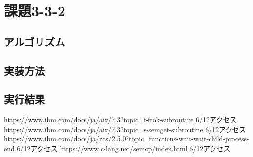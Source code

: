 \documentclass[dvipdfmx]{jarticle}
\begin{document}
\section{課題3-3-2}
\subsection{アルゴリズム}
\subsection{実装方法}
\subsection{実行結果}
\begin{thebibliography}{99}
     \url{https://www.ibm.com/docs/ja/aix/7.3?topic=f-ftok-subroutine} 6/12アクセス
     \url{https://www.ibm.com/docs/ja/aix/7.3?topic=s-semget-subroutine} 6/12アクセス
     \url{https://www.ibm.com/docs/ja/zos/2.5.0?topic=functions-wait-wait-child-process-end} 6/12アクセス
     \url{https://www.c-lang.net/semop/index.html} 6/12アクセス
\end{thebibliography}
\end{document}
